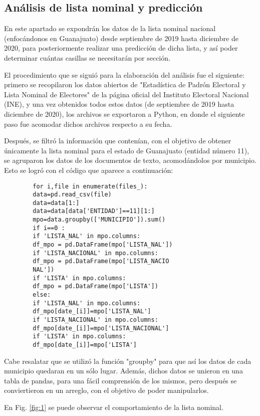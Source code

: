 \documentclass[11pt]{article}
\begin{document}
\begin{multicols}{2}
	\section{Análisis de lista nominal y predicción}
	En este apartado se expondrán los datos de la lista nominal nacional (enfocándonos en Guanajuato) desde septiembre de 2019 hasta diciembre de 2020, para posteriormente realizar una predicción de dicha lista, y así poder determinar cuántas casillas se necesitarán por  sección.\par
	El procedimiento que se siguió para la elaboración del análisis fue el siguiente: primero se recopilaron los datos abiertos de "Estadística de Padrón Electoral y Lista Nominal de Electores" de la página oficial del Instituto Electoral Nacional (INE), y una vez obtenidos todos estos datos (de septiembre de 2019 hasta diciembre de 2020), los archivos se exportaron a Python, en donde el siguiente paso fue acomodar dichos archivos respecto a su fecha. \par 
	Después, se filtró la información que contenían, con el objetivo de obtener únicamente la lista nominal para el estado de Guanajuato (entidad número 11), se agruparon los datos de los documentos de texto, acomodándolos por municipio. Esto se logró con el código que aparece a continuación:
	\begin{verbatim}	
		for i,file in enumerate(files_):
		data=pd.read_csv(file)
		data=data[1:]
		data=data[data['ENTIDAD']==11][1:]
		mpo=data.groupby(['MUNICIPIO']).sum()
		if i==0 :
		if 'LISTA_NAL' in mpo.columns:
		df_mpo = pd.DataFrame(mpo['LISTA_NAL'])
		if 'LISTA_NACIONAL' in mpo.columns:
		df_mpo = pd.DataFrame(mpo['LISTA_NACIO
		NAL'])
		if 'LISTA' in mpo.columns:
		df_mpo = pd.DataFrame(mpo['LISTA'])
		else:
		if 'LISTA_NAL' in mpo.columns:
		df_mpo[date_[i]]=mpo['LISTA_NAL']
		if 'LISTA_NACIONAL' in mpo.columns:
		df_mpo[date_[i]]=mpo['LISTA_NACIONAL']
		if 'LISTA' in mpo.columns:
		df_mpo[date_[i]]=mpo['LISTA']	
	\end{verbatim}
	Cabe resalatar que se utilizó la función "groupby" para que así los datos de cada municipio quedaran en un sólo lugar. 
	Además, dichos datos se unieron en una tabla de pandas, para una fácil comprensión de los mismos, pero después se conviertieron en un arreglo, con el objetivo de poder manipularlos.\par 

	En Fig. \ref{fig:1} se puede observar el comportamiento de la lista nominal.
\end{multicols}
\end{document}
